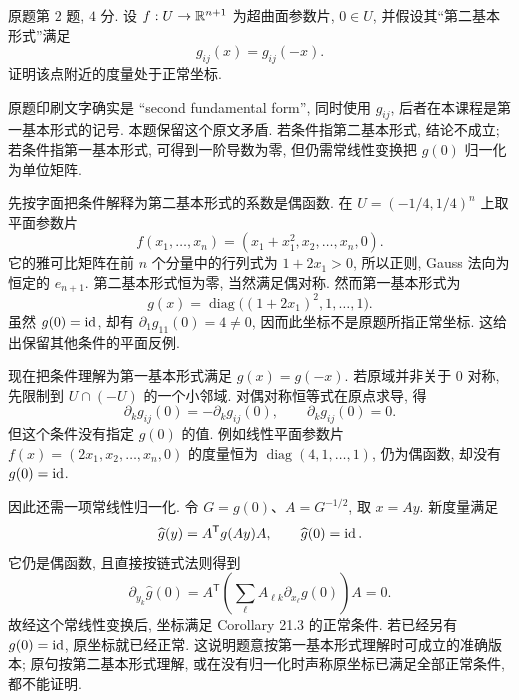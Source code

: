 \begin{exercise}\label{ps:7-2}
原题第 $2$ 题, $4$ 分. 设 $f:U\to\mathbb R^{n+1}$ 为超曲面参数片, $0\in U$, 并假设其``第二基本形式''满足
\[
 g_{ij}(x)=g_{ij}(-x).
\]
证明该点附近的度量处于正常坐标.
\end{exercise}
\begin{remark}
原题印刷文字确实是 ``second fundamental form'', 同时使用 $g_{ij}$, 后者在本课程是第一基本形式的记号. 本题保留这个原文矛盾. 若条件指第二基本形式, 结论不成立; 若条件指第一基本形式, 可得到一阶导数为零, 但仍需常线性变换把 $g(0)$ 归一化为单位矩阵.
\end{remark}
\begin{solution}
先按字面把条件解释为第二基本形式的系数是偶函数. 在 $U=(-1/4,1/4)^n$ 上取平面参数片
\[
 f(x_1,\ldots,x_n)=(x_1+x_1^2,x_2,\ldots,x_n,0).
\]
它的雅可比矩阵在前 $n$ 个分量中的行列式为 $1+2x_1>0$, 所以正则, Gauss 法向为恒定的 $e_{n+1}$. 第二基本形式恒为零, 当然满足偶对称. 然而第一基本形式为
\[
 g(x)=\operatorname{diag}\bigl((1+2x_1)^2,1,\ldots,1\bigr).
\]
虽然 $g(0)=\operatorname{id}$, 却有 $\partial_1g_{11}(0)=4\ne0$, 因而此坐标不是原题所指正常坐标. 这给出保留其他条件的平面反例.

现在把条件理解为第一基本形式满足 $g(x)=g(-x)$. 若原域并非关于 $0$ 对称, 先限制到 $U\cap(-U)$ 的一个小邻域. 对偶对称恒等式在原点求导, 得
\[
 \partial_k g_{ij}(0)=-\partial_k g_{ij}(0),\qquad
 \partial_k g_{ij}(0)=0.
\]
但这个条件没有指定 $g(0)$ 的值. 例如线性平面参数片
$f(x)=(2x_1,x_2,\ldots,x_n,0)$ 的度量恒为 $\operatorname{diag}(4,1,\ldots,1)$, 仍为偶函数, 却没有 $g(0)=\operatorname{id}$.

因此还需一项常线性归一化. 令 $G=g(0)$、$A=G^{-1/2}$, 取 $x=Ay$. 新度量满足
\[
 \widehat g(y)=A^{\mathsf T}g(Ay)A,\qquad \widehat g(0)=\operatorname{id}.
\]
它仍是偶函数, 且直接按链式法则得到
\[
 \partial_{y_k}\widehat g(0)
 =A^{\mathsf T}\left(\sum_\ell A_{\ell k}\partial_{x_\ell}g(0)\right)A=0.
\]
故经这个常线性变换后, 坐标满足 Corollary 21.3 的正常条件. 若已经另有 $g(0)=\operatorname{id}$, 原坐标就已经正常. 这说明题意按第一基本形式理解时可成立的准确版本; 原句按第二基本形式理解, 或在没有归一化时声称原坐标已满足全部正常条件, 都不能证明.
\end{solution}

